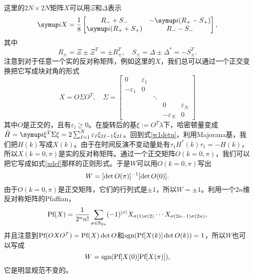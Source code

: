 这里的$2N\times 2N$矩阵$X$可以用$\Xi$和$\Delta$表示
\begin{equation}
  \iu X = \frac{1}{8}\begin{bmatrix}
      R_- + S_- & -\iu (R_+ -S_+)\\
      \iu (R_+ +S_+) & R_- -S_-
  \end{bmatrix},
\end{equation}
其中
\begin{equation}
  R_\pm =\Xi \pm \Xi^T = \pm R_\pm^T ,\quad S_\pm = \Delta\pm \Delta^* =-S_\pm^T.
\end{equation}
注意到对于任意一个实的反对称矩阵，例如这里的$X$，我们总可以通过一个正交变换把它写成块对角的形式
\begin{equation}
  X= O\Sigma O^T,\quad \Sigma = \begin{bmatrix}
      0 & \varepsilon_1 & & &\\
      -\varepsilon_1 & 0 & & &\\
      & & \ddots & & \\
      & & & 0 & \varepsilon_N\\
      & & & -\varepsilon_N & 0
  \end{bmatrix}\label{xdef}
\end{equation}
其中$O$是正交的，且有$\varepsilon_l\geq 0$。在旋转后的基$\xi:= O^T\lambda $下，哈密顿量变成$\hat H = \iu \xi^T \Sigma \xi = 2 \sum_{I=1}^N \varepsilon_I \xi_{2I-1} \xi_{2I}$。回到式\eqref{w1detu}，利用Majorana基，我们把$H(k)$写成$X(k)$。由于在时间反演不变动量处有$\tau_1 H^*(k) \tau_1 = -H(k)$，所以$X(k=0,\pi)$是实的反对称矩阵。通过一个正交矩阵$O(k=0,\pi)$，我们可以把它写成如式\eqref{xdef}那样的正则形式。于是$W$可以用$O(k=0,\pi)$写出
\begin{equation}
  W= [\det O(\pi)]^{-1} [\det O(0)].
\end{equation}
由于$O(k=0,\pi)$是正交矩阵，它们的行列式是$\pm1$，所以$W=\pm1$。利用一个$2n$维反对称矩阵的Pfaffian，
\begin{equation}
  \textnormal{Pf}(X) = \frac{1}{2^n n!} \sum_{\sigma\in \mathrm{S}_{2n}} (-1)^{\abs{\sigma}} X_{\sigma(1)\sigma(2)}\cdots X_{\sigma(2n-1)\sigma(2n)},
\end{equation}
并且注意到$\textnormal{Pf}(OXO^T)= \textnormal{Pf}(X)\det O$和$\textnormal{sgn}(\textnormal{Pf}[X(k)]\det O(k))=1$，所以$W$也可以写成
\begin{equation}
  W=\textnormal{sgn} (\textnormal{Pf}[X(0)]\textnormal{Pf}[X(\pi)]),
\end{equation}
它是明显规范不变的。

